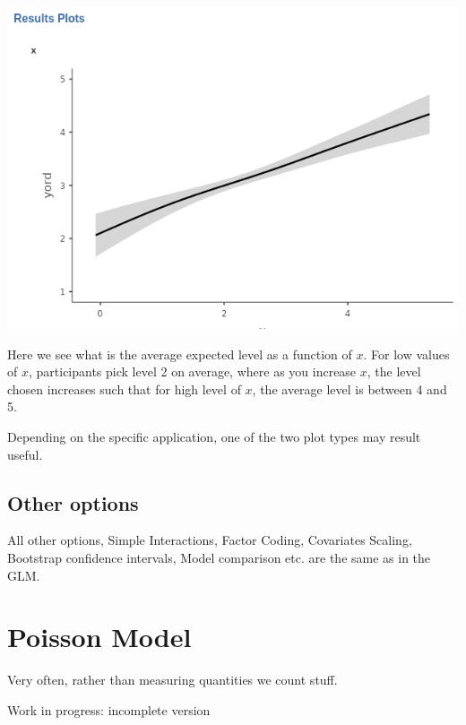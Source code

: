 \documentclass[
]{book}
\newlength{\cslhangindent}
\newlength{\cslentryspacingunit} %
\newenvironment{CSLReferences}[2] %
 {%
  \setlength{\parindent}{0pt}
  \ifodd #1
  \let\oldpar\par
  \def\par{\hangindent=\cslhangindent\oldpar}
  \fi
  \setlength{\parskip}{#2\cslentryspacingunit}
 }%
 {}
\begin{document}
\includegraphics[width=8.69in]{bookletpics/3_ordinal_plot2}

Here we see what is the average expected level as a function of \(x\). For low values of \(x\), participants pick level 2 on average, where as you increase \(x\), the level chosen increases such that for high level of \(x\), the average level is between 4 and 5.

Depending on the specific application, one of the two plot types may result useful.

\hypertarget{other-options-2}{%
\subsection{Other options}\label{other-options-2}}

All other options, {Simple Interactions}, {Factor Coding}, {Covariates Scaling}, {Bootstrap} confidence intervals, {Model comparison} etc. are the same as in the GLM.

\hypertarget{poisson-model}{%
\section{Poisson Model}\label{poisson-model}}

Very often, rather than measuring quantities we count stuff.

{ Work in progress: incomplete version }

\hypertarget{refs}{}
\begin{CSLReferences}{0}{0}
\end{CSLReferences}

\hypertarget{appendix-appendix}{%
\appendix}
\end{document}
